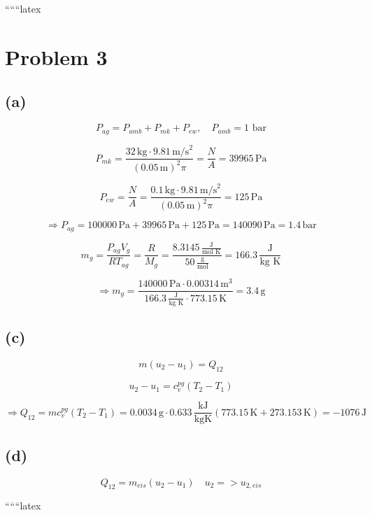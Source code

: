 
``````latex


\section*{Problem 3}

\subsection*{(a)}

\[
P_{ag} = P_{amb} + P_{mk} + P_{ew}, \quad P_{amb} = 1 \text{ bar}
\]

\[
P_{mk} = \frac{32 \, \text{kg} \cdot 9.81 \, \text{m/s}^2}{(0.05 \, \text{m})^2 \pi} = \frac{N}{A} = 39965 \, \text{Pa}
\]

\[
P_{ew} = \frac{N}{A} = \frac{0.1 \, \text{kg} \cdot 9.81 \, \text{m/s}^2}{(0.05 \, \text{m})^2 \pi} = 125 \, \text{Pa}
\]

\[
\Rightarrow P_{ag} = 100000 \, \text{Pa} + 39965 \, \text{Pa} + 125 \, \text{Pa} = 140090 \, \text{Pa} = 1.4 \, \text{bar}
\]

\[
m_g = \frac{P_{ag} V_g}{R T_{ag}} = \frac{R}{M_g} = \frac{8.3145 \, \frac{\text{J}}{\text{mol K}}}{50 \, \frac{\text{g}}{\text{mol}}} = 166.3 \, \frac{\text{J}}{\text{kg K}}
\]

\[
\Rightarrow m_g = \frac{140000 \, \text{Pa} \cdot 0.00314 \, \text{m}^3}{166.3 \, \frac{\text{J}}{\text{kg K}} \cdot 773.15 \, \text{K}} = 3.4 \, \text{g}
\]

\subsection*{(c)}

\[
m (u_2 - u_1) = Q_{12}
\]

\[
u_2 - u_1 = c_v^{pg} (T_2 - T_1)
\]

\[
\Rightarrow Q_{12} = m c_v^{pg} (T_2 - T_1) = 0.0034 \, \text{g} \cdot 0.633 \, \frac{\text{kJ}}{\text{kgK}} (773.15 \, \text{K} + 273.153 \, \text{K}) = -1076 \, \text{J}
\]

\subsection*{(d)}

\[
Q_{12} = m_{eis} (u_2 - u_1) \quad u_2 = > u_{2,eis}
\]

``````latex


